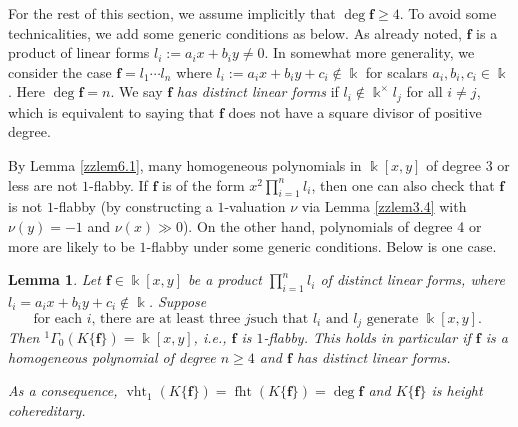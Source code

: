 \documentclass[12pt]{amsart}
\theoremstyle{plain}
\newtheorem{lemma}[theorem]{Lemma}
\numberwithin{theorem}{section}
\numberwithin{equation}{theorem}
\theoremstyle{definition}
\DeclareMathOperator{\fht}{fht}
\DeclareMathOperator{\vht}{vht}
\newcommand \bff {{\mathbf{f}}}
\begin{document}
For the rest of this section, we assume implicitly that 
$\deg \bff\geq 4$. To avoid some technicalities, we add some generic 
conditions as below. As already noted, $\bff$ is a product of 
linear forms $l_i := a_i x+b_i y \neq 0$. In somewhat more generality, we 
consider the case $\bff =l_1\cdots l_n$ where $l_i := 
a_i x+b_i y+c_i\not\in \Bbbk$ for scalars $a_i,b_i,c_i \in \Bbbk$. 
Here $\deg \bff =n$. We say $\bff$ 
\emph{has distinct linear forms} if $l_i\not\in {\Bbbk^\times} l_j$ 
for all $i\neq j$, which is equivalent to saying that $\bff$ does 
not have a square divisor of positive degree. 

By Lemma \ref{zzlem6.1}, many homogeneous polynomials in $\Bbbk[x,y]$ of degree 3 or 
less are not $1$-flabby. 
If $\bff$ is of the form $x^2\prod_{i=1}^{n} l_i$, 
then one can also check that $\bff$ is not $1$-flabby
(by constructing a $1$-valuation $\nu$ via Lemma \ref{zzlem3.4}
with $\nu(y)=-1$ and $\nu(x)\gg0$).
On the other hand,  polynomials of degree 4 or more are likely to be $1$-flabby under 
some generic conditions. Below is one case.

\begin{lemma}
\label{zzlem6.2}
Let $\bff \in \Bbbk[x,y]$ be a product
$\prod_{i=1}^n l_i$ of 
distinct linear forms, where $l_i=a_i x+b_i y+c_i\not\in \Bbbk$. 
Suppose 
\begin{equation}
\label{E6.2.1}\tag{E6.2.1}
{\text{
for each $i$, there are at least three $j$
such that $l_i$ and $l_j$ generate $\Bbbk[x,y]$. }}
\end{equation}
Then ${^1\Gamma_0}(K\{\bff\}) = \Bbbk[x,y]$, i.e., $\bff$ is $1$-flabby.  This holds in particular if $\bff$ is a homogeneous polynomial of degree $n\ge4$ and $\bff$ has distinct linear forms.

As a consequence, $\vht_1(K\{\bff\})= \fht(K\{\bff\})=\deg \bff$ and $K\{\bff\}$ is height 
cohereditary.
\end{lemma}
\end{document}
